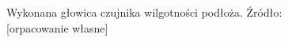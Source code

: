 \begin{figure}[h]
	\centering
	\setlength{\fboxsep}{0pt}
	\setlength{\fboxrule}{1pt}
	\caption{Wykonana głowica czujnika wilgotności podłoża. Źródło: [orpacowanie własne]} 
	\label{fig:czujnik wilg}
\end{figure}